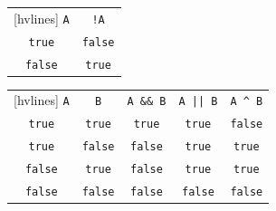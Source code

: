 \documentclass{article}
\begin{document}
\begin{table}[h!]
	\centering
	\begin{subtable}[h]{.2\textwidth}
		\centering
		\begin{NiceTabular}{||cc||}[hvlines]
			\RowStyle{\bfseries}\texttt{A} & \texttt{!A}\\
			\texttt{true} & \texttt{false}\\
			\texttt{false} & \texttt{true}
		\end{NiceTabular}
	\end{subtable}
	\begin{subtable}[h]{.7\textwidth}
		\centering
		\begin{NiceTabular}{||ccccc||}[hvlines]
			\RowStyle{\bfseries}\texttt{A} & \texttt{B} & \texttt{A \&\& B} & \texttt{A || B} & \texttt{A \^{} B}\\
			\texttt{true} & \texttt{true} & \texttt{true} & \texttt{true} & \texttt{false}\\
			\texttt{true} & \texttt{false} & \texttt{false} & \texttt{true} & \texttt{true}\\
			\texttt{false} & \texttt{true} & \texttt{false} & \texttt{true} & \texttt{true}\\
			\texttt{false} & \texttt{false} & \texttt{false} & \texttt{false} & \texttt{false}
		\end{NiceTabular}
	\end{subtable}
\end{table}
\end{document}
